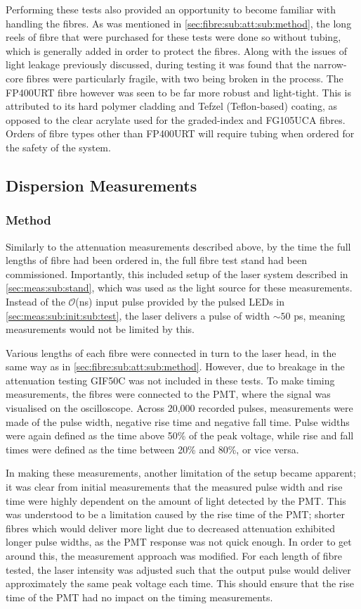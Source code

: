 \documentclass[a4paper,11pt]{article}
\let\oldsim\sim
\renewcommand{\sim}{{\oldsim}}
\begin{document}
Performing these tests also provided an opportunity to become familiar with handling the fibres. As was mentioned in \cref{sec:fibre:sub:att:sub:method}, the long reels of fibre that were purchased for these tests were done so without tubing, which is generally added in order to protect the fibres. Along with the issues of light leakage previously discussed, during testing it was found that the narrow-core fibres were particularly fragile, with two being broken in the process. The FP400URT fibre however was seen to be far more robust and light-tight. This is attributed to its hard polymer cladding and Tefzel (Teflon-based) coating, as opposed to the clear acrylate used for the graded-index and FG105UCA fibres. Orders of fibre types other than FP400URT will require tubing when ordered for the safety of the system.

\subsection{Dispersion Measurements}

\subsubsection{Method}

Similarly to the attenuation measurements described above, by the time the full lengths of fibre had been ordered in, the full fibre test stand had been commissioned. Importantly, this included setup of the laser system described in \cref{sec:meas:sub:stand}, which was used as the light source for these measurements. Instead of the $\mathcal{O}$(ns) input pulse provided by the pulsed LEDs in \cref{sec:meas:sub:init:sub:test}, the laser delivers a pulse of width $\sim50$ ps, meaning measurements would not be limited by this.

Various lengths of each fibre were connected in turn to the laser head, in the same way as in \cref{sec:fibre:sub:att:sub:method}. However, due to breakage in the attenuation testing GIF50C was not included in these tests. To make timing measurements, the fibres were connected to the PMT, where the signal was visualised on the oscilloscope. Across 20,000 recorded pulses, measurements were made of the pulse width, negative rise time and negative fall time. Pulse widths were again defined as the time above 50\% of the peak voltage, while rise and fall times were defined as the time between 20\% and 80\%, or vice versa.

In making these measurements, another limitation of the setup became apparent; it was clear from initial measurements that the measured pulse width and rise time were highly dependent on the amount of light detected by the PMT. This was understood to be a limitation caused by the rise time of the PMT; shorter fibres which would deliver more light due to decreased attenuation exhibited longer pulse widths, as the PMT response was not quick enough. In order to get around this, the measurement approach was modified. For each length of fibre tested, the laser intensity was adjusted such that the output pulse would deliver approximately the same peak voltage each time. This should ensure that the rise time of the PMT had no impact on the timing measurements.
\end{document}
